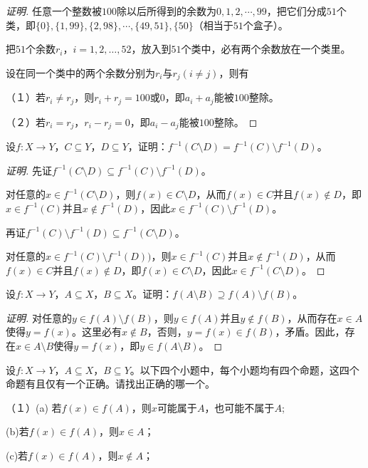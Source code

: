 \documentclass{article}
\begin{document}
\begin{CJK}{UTF8}{gbsn}
\begin{proof}[证明]
  任意一个整数被$100$除以后所得到的余数为$0,1,2,\cdots, 99$，把它们分成$51$个类，即$\{0\}, \{1,99\}, \{2,98\}, \cdots, \{49,51\}, \{50\}$（相当于$51$个盒子）。

  把$51$个余数$r_i$，$i=1,2,\ldots,52$，放入到$51$个类中，必有两个余数放在一个类里。

  设在同一个类中的两个余数分别为$r_i$与$r_j(i\neq j)$，则有

  （１）若$r_i\neq r_j$，则$r_i+r_j=100$或$0$，即$a_i+a_j$能被$100$整除。

  （２）若$r_i=r_j$，$r_i-r_j=0$，即$a_i-a_j$能被$100$整除。
\end{proof}
\begin{Exercise}
  设$f:X\to Y$，$C\subseteq Y$，$D\subseteq Y$，证明：$f^{-1}(C\setminus D)=f^{-1}(C)\setminus f^{-1}(D)$。
\end{Exercise}
\begin{proof}[证明]
  先证$f^{-1}(C\setminus D)\subseteq f^{-1}(C)\setminus f^{-1}(D)$。

  对任意的$x\in f^{-1}(C\setminus D)$，则$f(x)\in C\setminus D$，从而$f(x)\in C$并且$f(x)\notin D$，即$x\in f^{-1}(C)$并且$x\notin f^{-1}(D)$，因此$x\in f^{-1}(C)\setminus f^{-1}(D)$。

  再证$f^{-1}(C)\setminus f^{-1}(D)\subseteq f^{-1}(C\setminus D)$。

  对任意的$x\in f^{-1}(C)\setminus f^{-1}(D))$，则$x\in f^{-1}(C)$并且$x\notin f^{-1}(D)$，从而$f(x)\in C$并且$f(x)\notin D$，即$f(x)\in C\setminus D$，因此$x\in f^{-1}(C\setminus D)$。
\end{proof}
\begin{Exercise}
  设$f:X\to Y$，$A\subseteq X$，$B\subseteq X$。证明：$f(A\setminus B) \supseteq  f(A)\setminus f(B)$。
\end{Exercise}
\begin{proof}[证明]
对任意的$y\in  f(A)\setminus f(B)$，则$y\in f(A)$并且$y\notin f(B)$，从而存在$x\in A$使得$y=f(x)$。这里必有$x\notin B$，否则，$y=f(x)\in f(B)$，矛盾。因此，存在$x\in A\setminus B$使得$y=f(x)$，即$y\in f(A\setminus B)$。  
\end{proof}
\begin{Exercise}
  设$f:X\to Y$，$A\subseteq X$，$B\subseteq Y$。以下四个小题中，每个小题均有四个命题，这四个命题有且仅有一个正确。请找出正确的哪一个。

  （１）(a) 若$f(x)\in f(A)$，则$x$可能属于$A$，也可能不属于$A$;

  (b)若$f(x)\in f(A)$，则$x\in A$；

  (c)若$f(x)\in f(A)$，则$x\notin A$；


\end{Exercise}
\end{CJK}
\end{document}
